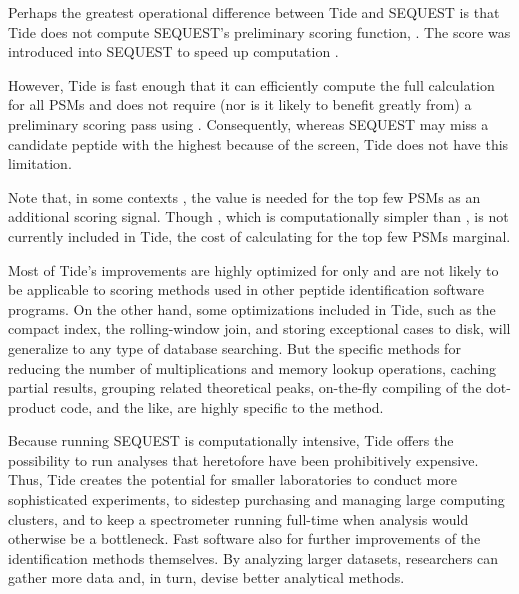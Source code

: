 Perhaps the greatest operational difference between Tide and SEQUEST
is that Tide does not compute SEQUEST's preliminary scoring function,
\Sp. The \Sp score was introduced into SEQUEST to speed up computation
\cite{eng:approach}.
\DIFaddbegin 

\DIFaddend However, Tide is fast enough that it can efficiently compute the full
\XCorr calculation for all PSMs and does not require (nor is it likely
to benefit greatly from) a preliminary scoring pass using \Sp.
Consequently, whereas SEQUEST may miss a candidate peptide with the
highest \XCorr because of the \Sp screen, Tide does not have this
limitation.
\DIFaddbegin 

\DIFaddend Note that, in some contexts \cite{anderson:new, keller:empirical,
kall:semi-supervised}, the \Sp value is needed for the top few PSMs as
an additional scoring signal. Though \Sp, which is computationally
simpler than \XCorr, is not currently included in Tide, the cost of
calculating \Sp for the top few PSMs \DIFdelbegin {}\DIFdelend \DIFaddbegin {}\DIFaddend marginal.


Most of Tide's improvements are highly optimized for \XCorr only and
are not likely to be applicable to scoring methods used in other
peptide identification software programs. On the other hand, some
optimizations included in Tide, such as the compact index, the
rolling-window join, and storing exceptional cases to disk, 
will generalize to any type of database searching. But
the specific methods for reducing the number of multiplications and
memory lookup operations, caching partial results, grouping related
theoretical peaks, on-the-fly compiling of the dot-product code, and
the like, are highly specific to the \XCorr method.

Because running SEQUEST is computationally intensive, Tide offers the
possibility to run analyses that heretofore have been prohibitively
expensive. Thus, Tide creates the potential for smaller laboratories
to conduct more sophisticated experiments, to sidestep purchasing and
managing large computing clusters, and to keep a spectrometer running
full-time when analysis would otherwise be a bottleneck. \DIFaddbegin {}\DIFaddend Fast software also \DIFdelbegin {}\DIFdelend \DIFaddbegin {}\DIFaddend for further improvements of the identification methods
themselves. By analyzing larger datasets, researchers can gather more
data and, in turn, devise better analytical methods.



